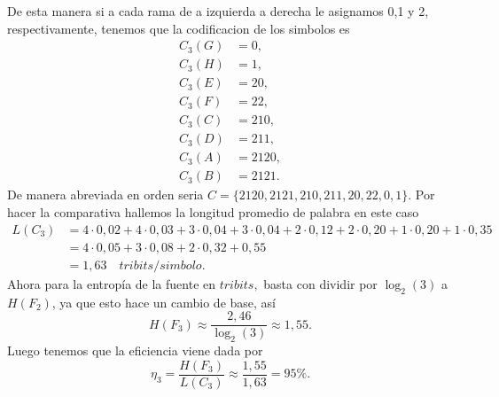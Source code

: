 \begin{sols}
\begin{center}
    \end{center}
De esta manera si a cada rama de a izquierda a derecha le asignamos 0,1 y 2, respectivamente, tenemos que la codificacion de los simbolos es
\begin{align*}
    C_3(G)&=0,\\
    C_3(H)&=1,\\
    C_3(E)&=20,\\
    C_3(F)&=22,\\
    C_3(C)&=210,\\
    C_3(D)&=211,\\
    C_3(A)&=2120,\\
    C_3(B)&=2121.
\end{align*}
De manera abreviada en orden seria $C=\{2120,2121,210,211,20,22,0,1\}.$ Por hacer la comparativa hallemos la longitud promedio de palabra en este caso
\begin{align*}
    L(C_3)&=4\cdot0,02+4\cdot0,03+3\cdot0,04+3\cdot0,04+2\cdot0,12+2\cdot0,20+1\cdot0,20+1\cdot0,35\\
    &=4\cdot0,05+3\cdot0,08+2\cdot0,32+0,55\\
    &=1,63\quad tribits/simbolo.
\end{align*}
Ahora para la entropía de la fuente en $tribits,$ basta con dividir por $\log_2(3)$ a $H(F_2)$, ya que esto hace un cambio de base, así
$$H(F_3)\approx\frac{2,46}{\log_2(3)}\approx 1,55.$$
Luego tenemos que la eficiencia viene dada por
$$\eta_3=\frac{H(F_3)}{L(C_3)}\approx\frac{1,55}{1,63}=95\%.$$



\end{sols}